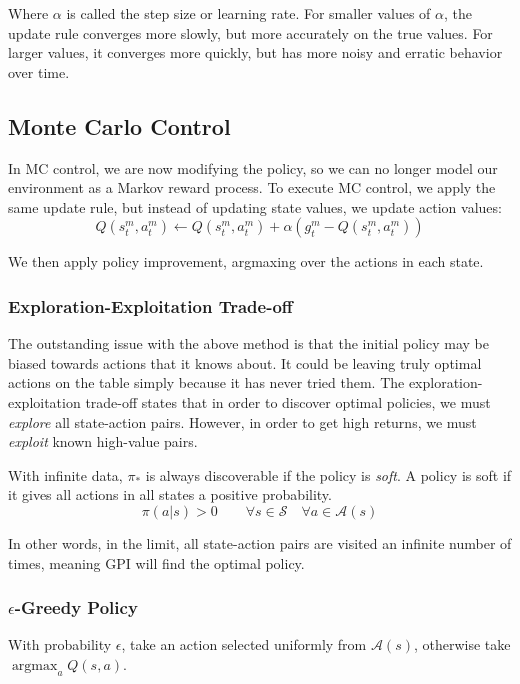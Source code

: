 \documentclass{article}
\DeclareMathOperator*{\argmax}{argmax}
\begin{document}
Where $\alpha$ is called the step size or learning rate. For smaller values of $\alpha$, the update rule converges more slowly, but more accurately
on the true values. For larger values, it converges more quickly, but has more noisy and erratic behavior over time. 

\subsection{Monte Carlo Control}
\label{sec:mc-control}
In MC control, we are now modifying the policy, so we can no longer model our environment as a Markov reward process. To execute MC control, 
we apply the same update rule, but instead of updating state values, we update action values:
\begin{equation}
  Q(s_t^m, a_t^m) \leftarrow Q(s_t^m, a_t^m) + \alpha (g_t^m - Q(s_t^m, a_t^m))
\end{equation}

We then apply policy improvement, argmaxing over the actions in each state.

\subsubsection{Exploration-Exploitation Trade-off}
The outstanding issue with the above method is that the initial policy may be biased towards actions that it knows about.
It could be leaving truly optimal actions on the table simply because it has never tried them. The exploration-exploitation
trade-off states that in order to discover optimal policies, we must \emph{explore} all state-action pairs. However, in order to get
high returns, we must \emph{exploit} known high-value pairs. 

With infinite data, $\pi_*$ is always discoverable if the policy is \emph{soft}. A policy is soft if it gives all actions in all states
a positive probability.
\begin{equation}
  \pi(a|s) > 0 \qquad \forall s \in \mathcal{S} \quad \forall a \in \mathcal{A}(s)
\end{equation}

In other words, in the limit, all state-action pairs are visited an infinite number of times, meaning GPI will find the optimal policy.

\subsubsection{$\epsilon$-Greedy Policy}
With probability $\epsilon$, take an action selected uniformly from $\mathcal{A}(s)$, otherwise take $\argmax_a Q(s,a)$.
\end{document}
